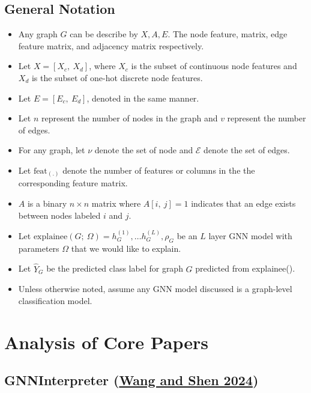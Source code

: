 \documentclass[
  11pt,
  letterpaper,
]{article}
\begin{document}
\hypertarget{general-notation}{%
\subsection{General Notation}\label{general-notation}}

\begin{itemize}
\item
  Any graph \(G\) can be describe by \(X, A, E\). The node feature,
  matrix, edge feature matrix, and adjacency matrix respectively.
\item
  Let \(X = [X_c, \ X_d]\), where \(X_c\) is the subset of continuous
  node features and \(X_d\) is the subset of one-hot discrete node
  features.
\item
  Let \(E = [E_c, \ E_d]\), denoted in the same manner.
\item
  Let \(n\) represent the number of nodes in the graph and \(v\)
  represent the number of edges.
\item
  For any graph, let \(\nu\) denote the set of node and \(\mathcal{E}\)
  denote the set of edges.
\item
  Let \(\text{feat}_{(.)}\) denote the number of features or columns in
  the the corresponding feature matrix.
\item
  \(A\) is a binary \(n \times n\) matrix where \(A[i, \ j] = 1\)
  indicates that an edge exists between nodes labeled \(i\) and \(j\).
\item
  Let
  \(\text{explainee}(G; \ \Omega) = h^{(1)}_G, \dots h^{(L)}_G, \rho_G\)
  be an \(L\) layer GNN model with parameters \(\Omega\) that we would
  like to explain.
\item
  Let \(\hat Y_G\) be the predicted class label for graph \(G\)
  predicted from explainee().
\item
  Unless otherwise noted, assume any GNN model discussed is a
  graph-level classification model.
\end{itemize}

\hypertarget{analysis-of-core-papers}{%
\section{Analysis of Core Papers}\label{analysis-of-core-papers}}

\hypertarget{gnninterpreter-wang_shen_2024}{%
\subsection{\texorpdfstring{GNNInterpreter
(\protect\hyperlink{ref-Wang_Shen_2024}{Wang and Shen
2024})}{GNNInterpreter (Wang and Shen 2024)}}\label{gnninterpreter-wang_shen_2024}}
\end{document}
